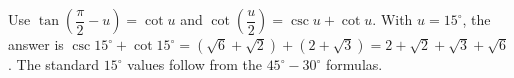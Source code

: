 Use $\tan(\dfrac{\pi}{2}-u)=\cot u$ and $\cot(\dfrac{u}{2})=\csc u+\cot u$. With $u=15^\circ$, the answer is $\csc15^\circ+\cot15^\circ=(\sqrt6+\sqrt2)+(2+\sqrt3)=\boxed{2+\sqrt2+\sqrt3+\sqrt6}$. The standard $15^\circ$ values follow from the $45^\circ-30^\circ$ formulas.
